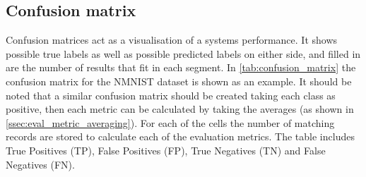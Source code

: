 \subsection{Confusion matrix}

Confusion matrices act as a visualisation of a systems performance. It shows possible true labels as well as possible predicted labels on either side, and filled in are the number of results that fit in each segment. In \cref{tab:confusion_matrix} the confusion matrix for the NMNIST dataset is shown as an example. It should be noted that a similar confusion matrix should be created taking each class as positive, then each metric can be calculated by taking the averages (as shown in \cref{ssec:eval_metric_averaging}). For each of the cells the number of matching records are stored to calculate each of the evaluation metrics. The table includes True Positives (TP), False Positives (FP), True Negatives (TN) and False Negatives (FN).

